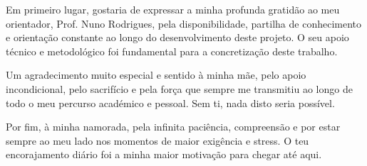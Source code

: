 

Em primeiro lugar, gostaria de expressar a minha profunda gratidão ao meu orientador, Prof. Nuno Rodrigues, pela disponibilidade, partilha de conhecimento e orientação constante ao longo do desenvolvimento deste projeto. O seu apoio técnico e metodológico foi fundamental para a concretização deste trabalho.

Um agradecimento muito especial e sentido à minha mãe, pelo apoio incondicional, pelo sacrifício e pela força que sempre me transmitiu ao longo de todo o meu percurso académico e pessoal. Sem ti, nada disto seria possível.

Por fim, à minha namorada, pela infinita paciência, compreensão e por estar sempre ao meu lado nos momentos de maior exigência e stress. O teu encorajamento diário foi a minha maior motivação para chegar até aqui.


